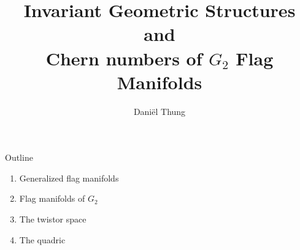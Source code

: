 \documentclass[11pt,parskip]{beamer}
\title[]{Invariant Geometric Structures and \\ Chern numbers of  $G_2$ Flag Manifolds}
\author[]{Dani\"el Thung}
\institute[]{LMU Munich}
\date{}
\begin{document}
\begin{frame}[plain]
\maketitle
\end{frame}

\begin{frame}{Outline}
	\begin{enumerate}
		\item Generalized flag manifolds
		\bigskip
		\item Flag manifolds of $G_2$
		\bigskip
		\item The twistor space
		\bigskip
		\item The quadric
	\end{enumerate}
\end{frame}
\end{document}
